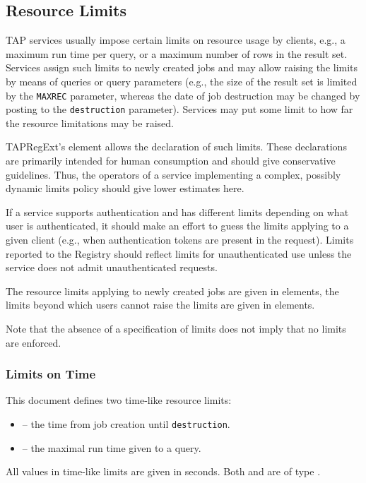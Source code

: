 \documentclass{ivoa}
\begin{document}

\subsection{Resource Limits}

\label{reslimits}

TAP services usually impose certain limits on resource usage by clients,
e.g., a maximum run time per query, or a maximum number of rows in the result
set.  Services assign such limits to newly created jobs and may
allow raising the limits by means of queries or query parameters (e.g., the
size of the result set is limited by the \texttt{MAXREC} parameter, whereas
the date of job destruction may be changed by posting to the
\texttt{destruction} parameter).  Services may put some limit to how
far the resource limitations may be raised.

TAPRegExt's  element allows the declaration of such limits.
These declarations are primarily intended for human consumption and should give
conservative guidelines.  Thus, the operators of a service implementing a
complex, possibly dynamic limits policy should give lower estimates here.

If a service supports authentication and has different
limits depending on what user is authenticated, it should make an effort
to guess the limits applying to a given client (e.g., when
authentication tokens are present in the request).  Limits reported to
the Registry should reflect limits for unauthenticated use unless the
service does not admit unauthenticated requests.

The resource limits applying to newly created jobs are given in
 elements, the limits beyond which users cannot
raise the limits are given in  elements.

Note that the absence of a specification of limits does not imply that
no limits are enforced.


\subsubsection{Limits on Time}
This document defines two time-like resource limits:


\begin{itemize}

\item {} -- the time from job creation until
		\texttt{destruction}.{}

\item {} -- the maximal run time given to
		a query.{}

\end{itemize}
All values in time-like limits are given in seconds.  Both 
 and  are of type
.
\end{document}
